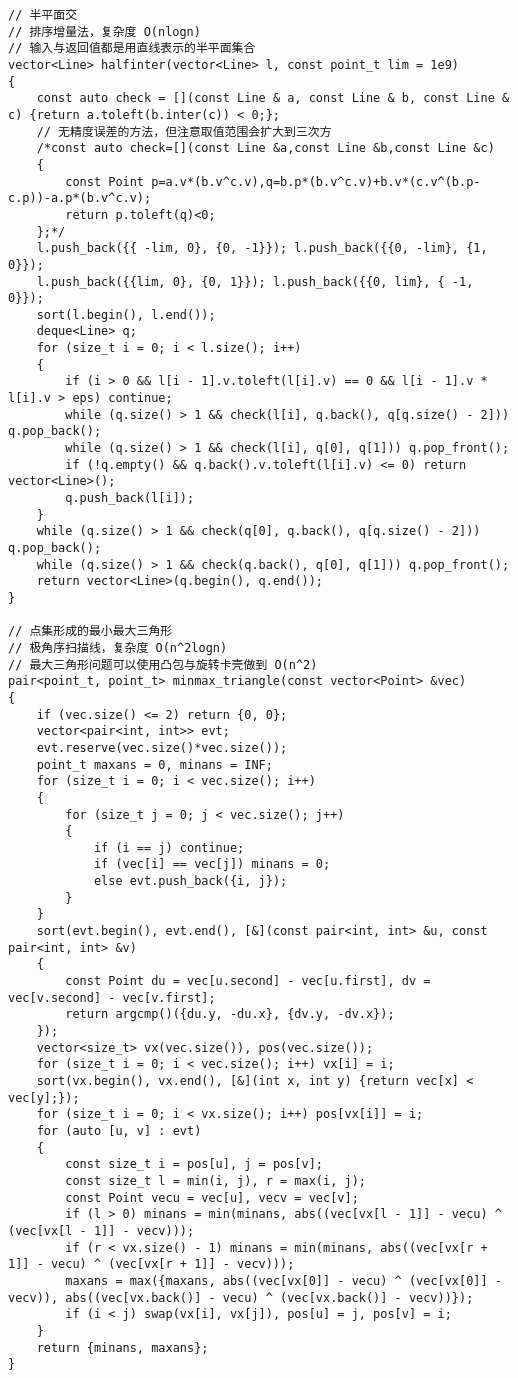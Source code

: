 \documentclass[a4paper,10pt]{article}
\begin{document}
\begin{lstlisting}
// 半平面交
// 排序增量法，复杂度 O(nlogn)
// 输入与返回值都是用直线表示的半平面集合
vector<Line> halfinter(vector<Line> l, const point_t lim = 1e9)
{
    const auto check = [](const Line & a, const Line & b, const Line & c) {return a.toleft(b.inter(c)) < 0;};
    // 无精度误差的方法，但注意取值范围会扩大到三次方
    /*const auto check=[](const Line &a,const Line &b,const Line &c)
    {
        const Point p=a.v*(b.v^c.v),q=b.p*(b.v^c.v)+b.v*(c.v^(b.p-c.p))-a.p*(b.v^c.v);
        return p.toleft(q)<0;
    };*/
    l.push_back({{ -lim, 0}, {0, -1}}); l.push_back({{0, -lim}, {1, 0}});
    l.push_back({{lim, 0}, {0, 1}}); l.push_back({{0, lim}, { -1, 0}});
    sort(l.begin(), l.end());
    deque<Line> q;
    for (size_t i = 0; i < l.size(); i++)
    {
        if (i > 0 && l[i - 1].v.toleft(l[i].v) == 0 && l[i - 1].v * l[i].v > eps) continue;
        while (q.size() > 1 && check(l[i], q.back(), q[q.size() - 2])) q.pop_back();
        while (q.size() > 1 && check(l[i], q[0], q[1])) q.pop_front();
        if (!q.empty() && q.back().v.toleft(l[i].v) <= 0) return vector<Line>();
        q.push_back(l[i]);
    }
    while (q.size() > 1 && check(q[0], q.back(), q[q.size() - 2])) q.pop_back();
    while (q.size() > 1 && check(q.back(), q[0], q[1])) q.pop_front();
    return vector<Line>(q.begin(), q.end());
}

// 点集形成的最小最大三角形
// 极角序扫描线，复杂度 O(n^2logn)
// 最大三角形问题可以使用凸包与旋转卡壳做到 O(n^2)
pair<point_t, point_t> minmax_triangle(const vector<Point> &vec)
{
    if (vec.size() <= 2) return {0, 0};
    vector<pair<int, int>> evt;
    evt.reserve(vec.size()*vec.size());
    point_t maxans = 0, minans = INF;
    for (size_t i = 0; i < vec.size(); i++)
    {
        for (size_t j = 0; j < vec.size(); j++)
        {
            if (i == j) continue;
            if (vec[i] == vec[j]) minans = 0;
            else evt.push_back({i, j});
        }
    }
    sort(evt.begin(), evt.end(), [&](const pair<int, int> &u, const pair<int, int> &v)
    {
        const Point du = vec[u.second] - vec[u.first], dv = vec[v.second] - vec[v.first];
        return argcmp()({du.y, -du.x}, {dv.y, -dv.x});
    });
    vector<size_t> vx(vec.size()), pos(vec.size());
    for (size_t i = 0; i < vec.size(); i++) vx[i] = i;
    sort(vx.begin(), vx.end(), [&](int x, int y) {return vec[x] < vec[y];});
    for (size_t i = 0; i < vx.size(); i++) pos[vx[i]] = i;
    for (auto [u, v] : evt)
    {
        const size_t i = pos[u], j = pos[v];
        const size_t l = min(i, j), r = max(i, j);
        const Point vecu = vec[u], vecv = vec[v];
        if (l > 0) minans = min(minans, abs((vec[vx[l - 1]] - vecu) ^ (vec[vx[l - 1]] - vecv)));
        if (r < vx.size() - 1) minans = min(minans, abs((vec[vx[r + 1]] - vecu) ^ (vec[vx[r + 1]] - vecv)));
        maxans = max({maxans, abs((vec[vx[0]] - vecu) ^ (vec[vx[0]] - vecv)), abs((vec[vx.back()] - vecu) ^ (vec[vx.back()] - vecv))});
        if (i < j) swap(vx[i], vx[j]), pos[u] = j, pos[v] = i;
    }
    return {minans, maxans};
}


\end{lstlisting}
\end{document}
